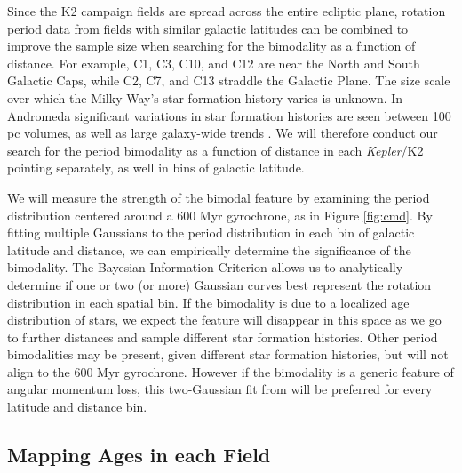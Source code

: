 \documentclass[12pt]{article}
\newcommand{\Kepler}{\textsl{Kepler}\xspace}
\begin{document}
Since the K2 campaign fields are spread across the entire ecliptic plane, rotation period data from fields with similar galactic latitudes can be combined to improve the sample size when searching for the bimodality as a function of distance. For example, C1, C3, C10, and C12 are near the North and South Galactic Caps, while C2, C7, and C13 straddle the Galactic Plane. The size scale over which the Milky Way's star formation history varies is unknown. In Andromeda significant variations in star formation histories are seen between 100 pc volumes, as well as large galaxy-wide trends \citep[e.g.][]{lewis2015}. We will therefore conduct our search for the period bimodality as a function of distance in each \Kepler/K2 pointing separately, as well in bins of galactic latitude.


We will measure the strength of the bimodal feature by examining the period distribution centered around a 600 Myr gyrochrone, as in Figure \ref{fig:cmd}. By fitting multiple Gaussians to the period distribution in each bin of galactic latitude and distance, we can empirically determine the significance of the bimodality. The Bayesian Information Criterion allows us to analytically determine if one or two (or more) Gaussian curves best represent the rotation distribution in each spatial bin.
 If the bimodality is due to a localized age distribution of stars, we expect the feature will disappear in this space as we go to further distances and sample different star formation histories. Other period bimodalities may be present, given different star formation histories, but will not align to the 600 Myr gyrochrone. However if the bimodality is a generic feature of angular momentum loss, this two-Gaussian fit from \citet{davenport2017} will be preferred for every latitude and distance bin.






\subsection{Mapping Ages in each Field}
\end{document}
